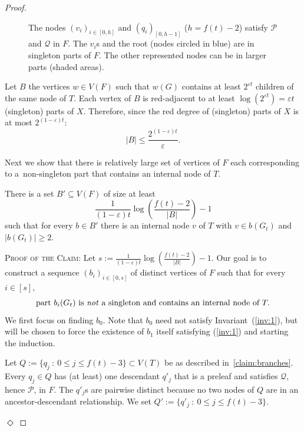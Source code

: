\documentclass[a4paper,UKenglish,cleveref,hyperref,autoref]{lipics-v2021}
\renewcommand{\leq}{\leqslant}
\newcommand{\prel}{preleaf\xspace}
\newenvironment{proofofclaim}{\noindent \textsc{Proof of the Claim:}}{\hfill$\Diamond$\medskip}
\newcommand\abs[1]{\lvert #1\rvert}
\begin{document}
\begin{proof}
\begin{figure}[ht!]
{
  }
  \caption{The nodes $(v_i)_{i \in [0,h]}$ and $(q_i)_{[0,h-1]}$ ($h=f(t)-2$) satisfy $\mathscr P$ and $\mathscr Q$ in $F$. The $v_i$s and the root (nodes circled in blue) are in singleton parts of $F$. The other represented nodes can be in larger parts (shaded areas).}
  \label{fig:sequence}
\end{figure}

Let $B$ the vertices $w \in V(F)$ such that $w(G)$ contains at least $2^{\varepsilon t}$ children of the same node of $T$.
Each vertex of $B$ is red-adjacent to at least $\log(2^{\varepsilon t})=\varepsilon t$ (singleton) parts of $X$.
Therefore, since the red degree of (singleton) parts of $X$ is at most $2^{(1-\varepsilon) t}$: $$|B|\leq \frac{2^{(1-\varepsilon) t}}{\varepsilon}.$$
  
  Next we show that there is relatively large set of vertices of $F$ each corresponding to a~non-singleton part that contains an internal node of $T$.
\begin{claim}
  There is a set $B' \subseteq V(F)$ of size at least $$\frac{1}{(1-\varepsilon) t} \log\left(\frac{f(t)-2}{\abs{B}}\right)-1$$ such that for every $b \in B'$ there is an internal node $v$ of $T$ with $v \in b(G_t)$ and $\abs{b(G_t)} \geqslant 2$.
\end{claim}

\begin{proofofclaim}
  Let $s := \frac{1}{(1-\varepsilon) t} \log(\frac{f(t)-2}{\abs{B}})-1$.
  Our goal is to construct a sequence $(b_i)_{i \in [0,s]}$ of distinct vertices of $F$ such that for every $i \in [s]$,
  \begin{equation}\label{inv:1}
    \text{part}~b_i(G_t)~\text{is \emph{not} a singleton and contains an internal node of}~T.
  \end{equation}
  We first focus on finding $b_0$.
  Note that $b_0$ need not satisfy Invariant~(\ref{inv:1}), but will be chosen to force the existence of $b_1$ itself satisfying (\ref{inv:1}) and starting the induction.
  
  Let $Q := \{q_j~:~0 \leq j \leq f(t)-3\} \subset V(T)$ be as described in~\cref{claim:branches}. 
  Every $q_j \in Q$ has (at least) one descendant $q'_j$ that is a \prel and satisfies $\mathscr Q$, hence $\mathscr P$, in $F$.
  The $q'_j$s are pairwise distinct because no two nodes of $Q$ are in an ancestor-descendant relationship.
  We set $Q' := \{q'_j~:~0 \leq j \leq f(t)-3\}$.


\end{proofofclaim}
\end{proof}
\end{document}

